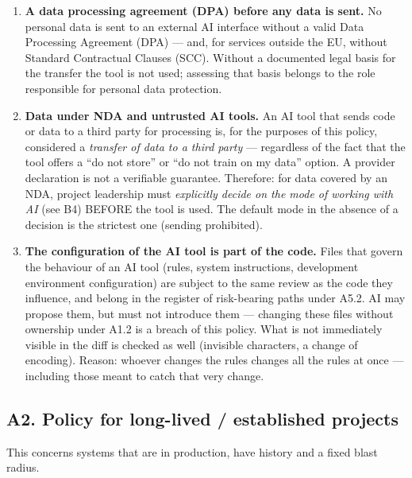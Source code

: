 \begin{enumerate}[label=\textbf{A1.\arabic*}]
For authentication, authorisation, encryption, persistence, OAuth tokens and audit logging, principle A1.2 applies in its strictest form: no matter who designed the code, the developer must take full ownership of it --- back it with a threat model and tests, and defend every decision without AI.
Without that ownership the code must not enter these areas, even if it \enquote{works}.
\item \textbf{A data processing agreement (DPA) before any data is sent.}
No personal data is sent to an external AI interface without a valid Data Processing Agreement (DPA) --- and, for services outside the EU, without Standard Contractual Clauses (SCC).
Without a documented legal basis for the transfer the tool is not used; assessing that basis belongs to the role responsible for personal data protection.
\item \textbf{Data under NDA and untrusted AI tools.}
An AI tool that sends code or data to a third party for processing is, for the purposes of this policy, considered a \emph{transfer of data to a third party} --- regardless of the fact that the tool offers a \enquote{do not store} or \enquote{do not train on my data} option.
A provider declaration is not a verifiable guarantee.
Therefore: for data covered by an NDA, project leadership must \emph{explicitly decide on the mode of working with AI} (see B4) BEFORE the tool is used.
The default mode in the absence of a decision is the strictest one (sending prohibited).
\item \textbf{The configuration of the AI tool is part of the code.}
Files that govern the behaviour of an AI tool (rules, system instructions, development environment configuration) are subject to the same review as the code they influence, and belong in the register of risk-bearing paths under A5.2.
AI may propose them, but must not introduce them --- changing these files without ownership under A1.2 is a breach of this policy.
What is not immediately visible in the diff is checked as well (invisible characters, a change of encoding).
Reason: whoever changes the rules changes all the rules at once --- including those meant to catch that very change.
\end{enumerate}

\subsection{A2. Policy for long-lived / established projects}

This concerns systems that are in production, have history and a fixed blast radius.

